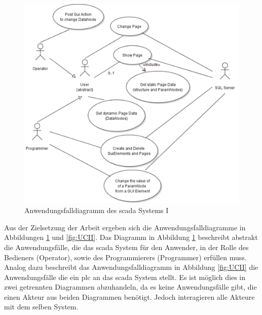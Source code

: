 \begin{figure}[ht]
  \centering
  \includegraphics[width=\textwidth]{content/hauptteil/systemEntwurf/res/useCase/I.pdf}
  \caption[Anwendungsfalldiagramm des \acs{scada} Systems I]{Anwendungsfalldiagramm des \acs{scada} Systems I}
  \label{fig:UCI}
\end{figure}
Aus der Zielsetzung der Arbeit ergeben sich die Anwendungsfalldiagramme in Abbildungen \ref{fig:UCI} und \ref{fig:UCII}.
Das Diagramm in Abbildung \ref{fig:UCI} beschreibt abstrakt die Anwendungsfälle, die das \ac{scada} System für den Anwender, in der Rolle des Bedieners (Operator), 
sowie des Programmierers (Programmer) erfüllen muss.
Analog dazu beschreibt das Anwendungsfalldiagramm in Abbildung \ref{fig:UCII} die Anwendungsfälle die ein \ac{plc} an das \ac{scada} System stellt.
Es ist möglich dies in zwei getrennten Diagrammen abzuhandeln, da es keine Anwendungsfälle gibt, die einen Akteur aus beiden Diagrammen benötigt.
Jedoch interagieren alle Akteure mit dem selben System.

